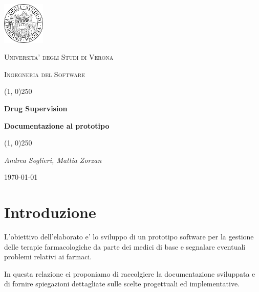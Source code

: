 \documentclass[a4paper, 11pt]{article}
\begin{document}
	\clearpage
	
	\begin{titlepage}
		\centering
		\vspace*{\fill}
		
		\includegraphics[width=0.15\textwidth]{logo.png}\par\vspace{1cm}
		{\scshape\LARGE Universita' degli Studi di Verona \par}
		\vspace{1cm}
		
		{\scshape\Large Ingegneria del Software \par}
		\vspace{1.5cm}
		\line(1, 0){250}
		
		{\huge\bfseries Drug Supervision\par}
		{\Large\bfseries Documentazione al prototipo \par}
		\line(1, 0){250}
		
		{\Large\itshape Andrea Soglieri, Mattia Zorzan \par}
		\vspace{5cm}
		\vspace*{\fill}
		
		{\Large \today\par}
	\end{titlepage}

	\tableofcontents
	\newpage
	
	\section{Introduzione}
		L'obiettivo dell'elaborato e' lo sviluppo di un prototipo software per la gestione delle terapie farmacologiche da parte dei medici di base e segnalare eventuali problemi relativi ai farmaci.
		
		In questa relazione ci proponiamo di raccolgiere la documentazione sviluppata e di fornire spiegazioni dettagliate sulle scelte progettuali ed implementative.
\end{document}
